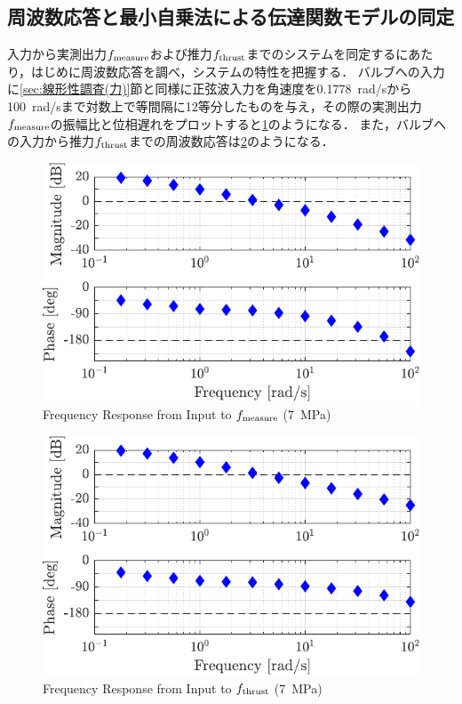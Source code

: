 \subsection{周波数応答と最小自乗法による伝達関数モデルの同定}
\label{sec:LD伝達関数モデル（力）}
入力から実測出力$f_\mathrm{measure}$および推力$f_\mathrm{thrust}$までのシステムを同定するにあたり，はじめに周波数応答を調べ，システムの特性を把握する．
バルブへの入力に\ref{sec:線形性調査(力)}節と同様に正弦波入力を角速度を\SI{0.1778}{rad/s}から\SI{100}{rad/s}まで対数上で等間隔に12等分したものを与え，その際の実測出力$f_\mathrm{measure}$の振幅比と位相遅れをプロットすると\figname\ref{fig:crop-1018_manubode_in2fmea_7MPa}のようになる．
また，バルブへの入力から推力$f_\mathrm{thrust}$までの周波数応答は\figname\ref{fig:crop-1018_manubode_in2fthr_7MPa}のようになる．
\begin{figure}[t]
    \centering
        \includegraphics[keepaspectratio, scale=1.0]{contents/SystemIdentification/figure/crop-1018_manubode_in2fmea_7MPa.pdf}
        \caption{Frequency Response from Input to $f_\mathrm{measure}$ (\SI{7}{MPa})}
        \label{fig:crop-1018_manubode_in2fmea_7MPa}
\end{figure}
\begin{figure}[t]
    \centering
        \includegraphics[keepaspectratio, scale=1.0]{contents/SystemIdentification/figure/crop-1018_manubode_in2fthr_7MPa.pdf}
        \caption{Frequency Response from Input to $f_\mathrm{thrust}$ (\SI{7}{MPa})}
        \label{fig:crop-1018_manubode_in2fthr_7MPa}
\end{figure}

